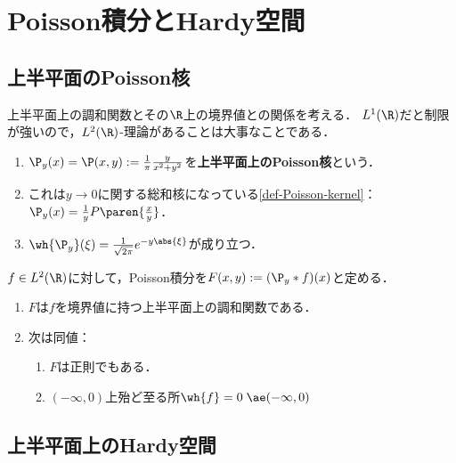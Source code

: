 \documentclass[uplatex,dvipdfmx]{jsreport}
\begin{document}
\section{Poisson積分とHardy空間}

\subsection{上半平面のPoisson核}

\begin{tcolorbox}[colframe=ForestGreen, colback=ForestGreen!10!white,breakable,colbacktitle=ForestGreen!40!white,coltitle=black,fonttitle=\bfseries\sffamily,
title=]
    上半平面上の調和関数とその$\R$上の境界値との関係を考える．
    $L^1(\R)$だと制限が強いので，$L^2(\R)$-理論があることは大事なことである．
\end{tcolorbox}

\begin{definition}\mbox{}
    \begin{enumerate}
        \item $\P_y(x)=\P(x,y):=\frac{1}{\pi}\frac{y}{x^2+y^2}$を\textbf{上半平面上のPoisson核}という．
        \item これは$y\to0$に関する総和核になっている\ref{def-Poisson-kernel}：$\P_y(x)=\frac{1}{y}P\paren{\frac{x}{y}}$．
        \item $\wh{\P_y}(\xi)=\frac{1}{\sqrt{2\pi}}e^{-y\abs{\xi}}$が成り立つ．
    \end{enumerate}
\end{definition}

\begin{theorem}
    $f\in L^2(\R)$に対して，Poisson積分を$F(x,y):=(\P_y*f)(x)$と定める．
    \begin{enumerate}
        \item $F$は$f$を境界値に持つ上半平面上の調和関数である．
        \item 次は同値：
        \begin{enumerate}
            \item $F$は正則でもある．
            \item $(-\infty,0)$上殆ど至る所$\wh{f}=0\;\ae(-\infty,0)$
        \end{enumerate}
    \end{enumerate}
\end{theorem}

\subsection{上半平面上のHardy空間}
\end{document}
